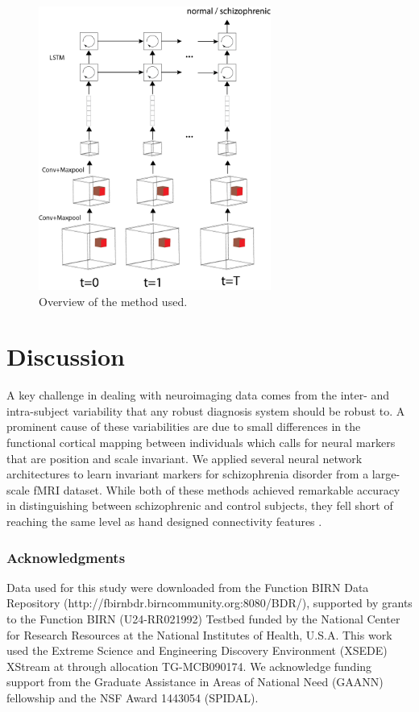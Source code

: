 \documentclass{article}
\begin{document}
\begin{figure}[t]
\begin{center}
\includegraphics[width=3in]{figures/overview.png}
\end{center}
\caption{Overview of the method used.}
\label{fig1}
\end{figure}

\section{Discussion}

A key challenge in dealing with neuroimaging data comes from the inter- and intra-subject variability that any robust diagnosis system should be robust to. A prominent cause of these variabilities are due to small differences in the functional cortical mapping between individuals which calls for neural markers that are position and scale invariant. We applied several neural network architectures to learn invariant markers for schizophrenia disorder from a large-scale fMRI dataset. While both of these methods achieved remarkable accuracy in distinguishing between schizophrenic and control subjects, they fell short of reaching the same level as hand designed connectivity features \citep{Gheiratmand2017}.


\subsubsection*{Acknowledgments}

Data used for this study were downloaded from the Function BIRN Data Repository (http://fbirnbdr.birncommunity.org:8080/BDR/), supported by grants to the Function BIRN (U24-RR021992) Testbed funded by the National Center for Research Resources at the National Institutes of Health, U.S.A. This work used the Extreme Science and Engineering Discovery Environment (XSEDE) XStream at through allocation TG-MCB090174. We acknowledge funding support from the Graduate Assistance in Areas of National Need (GAANN) fellowship and the NSF Award 1443054 (SPIDAL). 



\end{document}
